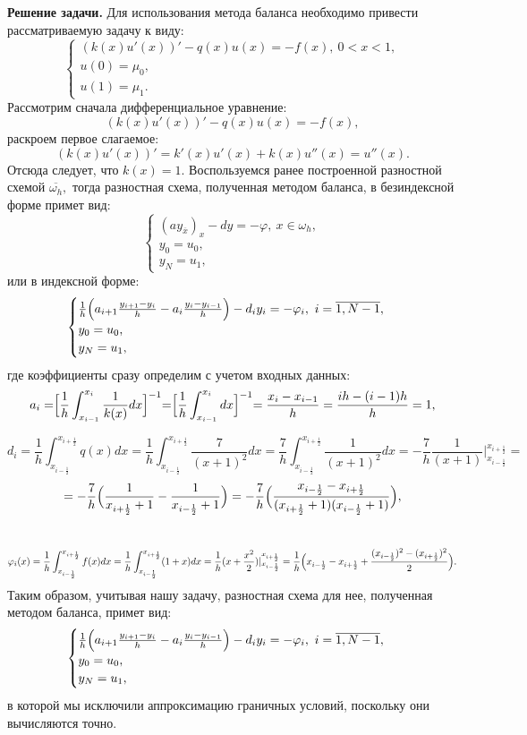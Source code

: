 \documentclass[11pt]{article}
\begin{document}
\textbf{Решение задачи.} 
Для использования метода баланса необходимо привести рассматриваемую задачу к виду:
$$\begin{cases}
    (k(x)u'(x))'-q(x)u(x)=-f(x),\ 0<x<1,\\
    u(0)=\mu_0,\\
    u(1)=\mu_1.
\end{cases}$$
Рассмотрим сначала дифференциальное уравнение:
$$(k(x)u'(x))'-q(x)u(x)=-f(x),$$
раскроем первое слагаемое:
$$(k(x)u'(x))' = k'(x)u'(x)+k(x)u''(x) = u''(x).$$
Отсюда следует, что $k(x)=1.$
Воспользуемся ранее построенной разностной схемой $\overline{\omega_h},$ тогда разностная схема, полученная методом баланса, в безиндексной форме примет вид:
$$\begin{cases}
    (ay_{\overline{x}})_x-dy=-\varphi,\ x\in \omega_h,\\
    y_0=u_0,\\
    y_N=u_1,
\end{cases}$$
или в индексной форме:
$$\begin{cases}
    \frac{1}{h}\Bigl(a_{i+1}\frac{y_{i+1}-y_i}{h}-a_i\frac{y_i-y_{i-1}}{h}\Bigr)-d_iy_i=-\varphi_i,\ i=\overline{1, N-1},\\
    y_0=u_0,\\
    y_N=u_1,
\end{cases}$$
где коэффициенты сразу определим с учетом входных данных:
$$a_i=\Bigr[ \frac{1}{h} \int_{x_{i-1}}^{x_{i}} \frac{1}{k(x)}dx \Bigl]^{-1}=\Bigr[ \frac{1}{h} \int_{x_{i-1}}^{x_{i}} dx \Bigl]^{-1}=\frac{x_i-x_{i-1}}{h}=\frac{ih-(i-1)h}{h}=1,$$

$$d_i=\frac{1}{h}  \int_{x_{i-\frac{1}{2}}}^{x_{i+\frac{1}{2}}} q(x)dx=\frac{1}{h}  \int_{x_{i-\frac{1}{2}}}^{x_{i+\frac{1}{2}}} \frac{7}{(x+1)^2}dx=\frac{7}{h}  \int_{x_{i-\frac{1}{2}}}^{x_{i+\frac{1}{2}}} \frac{1}{(x+1)^2}dx=-\frac{7}{h}  \frac{1}{(x+1)}|_{x_{i-\frac{1}{2}}}^{x_{i+\frac{1}{2}}}=$$$$=-\frac{7}{h}\Bigl(\frac{1}{x_{i+\frac{1}{2}}+1}-\frac{1}{x_{i-\frac{1}{2}}+1} \Bigr)=-\frac{7}{h}\Bigl(\frac{x_{i-\frac{1}{2}} - x_{i+\frac{1}{2}}}{(x_{i+\frac{1}{2}}+1)(x_{i-\frac{1}{2}}+1)} \Bigr),$$\
$$\varphi_i(x)=\frac{1}{h} \int_{x_{i-\frac{1}{2}}}^{x_{i+\frac{1}{2}}} f(x)dx=\frac{1}{h}\int_{x_{i-\frac{1}{2}}}^{x_{i+\frac{1}{2}}} (1+x)dx=\frac{1}{h}(x+\frac{x^2}{2})|_{x_{i-\frac{1}{2}}}^{x_{i+\frac{1}{2}}}=\frac{1}{h}\Bigl( x_{i-\frac{1}{2}}-x_{i+\frac{1}{2}}+\frac{(x_{i-\frac{1}{2}})^2-(x_{i+\frac{1}{2}})^2}{2} \Bigr).$$
Таким образом, учитывая нашу задачу, разностная схема для нее, полученная методом баланса, примет вид:
$$\begin{cases}
    \frac{1}{h}\Bigl(a_{i+1}\frac{y_{i+1}-y_i}{h}-a_i\frac{y_i-y_{i-1}}{h}\Bigr)-d_iy_i=-\varphi_i,\ i=\overline{1, N-1},\\
    y_0=u_0,\\
    y_N=u_1,
\end{cases}$$
в которой мы исключили аппроксимацию граничных условий, поскольку они вычисляются точно. 
\end{document}
